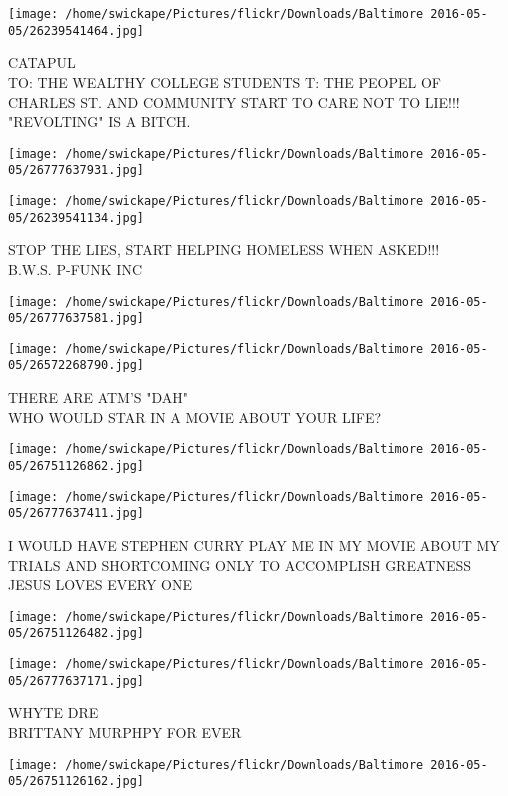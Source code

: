 \documentclass[10pt,letterpaper]{article}
\begin{document}
\vspace{0.25in}
\texttt{[image: /home/swickape/Pictures/flickr/Downloads/Baltimore 2016-05-05/26239541464.jpg]}

CATAPUL\\
TO: THE WEALTHY COLLEGE STUDENTS   T: THE PEOPEL OF CHARLES ST. AND COMMUNITY START TO CARE NOT TO LIE!!! "REVOLTING" IS A BITCH.
\pagebreak

\texttt{[image: /home/swickape/Pictures/flickr/Downloads/Baltimore 2016-05-05/26777637931.jpg]}

\vspace{0.25in}
\texttt{[image: /home/swickape/Pictures/flickr/Downloads/Baltimore 2016-05-05/26239541134.jpg]}

STOP THE LIES, START HELPING HOMELESS WHEN ASKED!!!\\
B.W.S. P{-}FUNK INC
\pagebreak

\texttt{[image: /home/swickape/Pictures/flickr/Downloads/Baltimore 2016-05-05/26777637581.jpg]}

\vspace{0.25in}
\texttt{[image: /home/swickape/Pictures/flickr/Downloads/Baltimore 2016-05-05/26572268790.jpg]}

THERE ARE ATM'S "DAH"\\
WHO WOULD STAR IN A MOVIE ABOUT YOUR LIFE?
\pagebreak

\texttt{[image: /home/swickape/Pictures/flickr/Downloads/Baltimore 2016-05-05/26751126862.jpg]}

\vspace{0.25in}
\texttt{[image: /home/swickape/Pictures/flickr/Downloads/Baltimore 2016-05-05/26777637411.jpg]}

I WOULD HAVE STEPHEN CURRY PLAY ME IN MY MOVIE ABOUT MY TRIALS AND SHORTCOMING ONLY TO ACCOMPLISH GREATNESS\\
JESUS LOVES EVERY ONE
\pagebreak

\texttt{[image: /home/swickape/Pictures/flickr/Downloads/Baltimore 2016-05-05/26751126482.jpg]}

\vspace{0.25in}
\texttt{[image: /home/swickape/Pictures/flickr/Downloads/Baltimore 2016-05-05/26777637171.jpg]}

WHYTE DRE\\
BRITTANY MURPHPY FOR EVER
\pagebreak

\texttt{[image: /home/swickape/Pictures/flickr/Downloads/Baltimore 2016-05-05/26751126162.jpg]}
\end{document}
